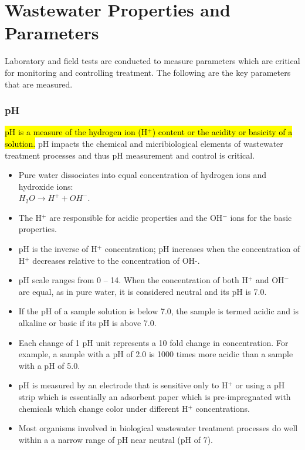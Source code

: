 



\chapter{Wastewater Properties and Parameters}
			
		Laboratory and field tests are conducted to measure parameters which are critical for monitoring and controlling treatment.  The following are the key parameters that are measured.	
			
\subsection{pH}	
			\hl{pH is a measure of the hydrogen ion (H$^+$) content or the acidity or basicity of a solution.}  pH impacts the chemical and micribiological elements of wastewater treatment processes and thus pH measurement and control is critical.
			\begin{itemize}
				\item Pure water dissociates into equal concentration of hydrogen ions and hydroxide ions:\\ 
				      $H_2O \rightarrow H^+ + OH^-$.
				\item The H$^+$ are responsible for acidic properties and the OH$^-$ ions for the basic properties.  
				\item pH is the inverse of H$^+$ concentration; pH increases when the concentration of H$^+$ decreases relative to the concentration of OH-. 
				\item pH scale ranges from 0 – 14. When the concentration of both H$^+$ and OH$^-$ are equal, as in pure water, it is considered neutral and its pH is 7.0.  \item If the pH of a sample solution is below 7.0, the sample is termed acidic and is alkaline or basic if its pH is above 7.0. 
				\item Each change of 1 pH unit represents a 10 fold change in concentration.  For example, a sample with a pH of 2.0 is 1000 times more acidic than a sample with a pH of 5.0. 
				\item pH is measured by an electrode that is sensitive only to H$^+$ or using a pH strip which is essentially an adsorbent paper which is pre-impregnated with chemicals which change color under different H$^+$ concentrations.
				\item Most organisms involved in biological wastewater treatment processes do well within a a narrow range of pH near neutral (pH of 7).			
			\end{itemize}
			
